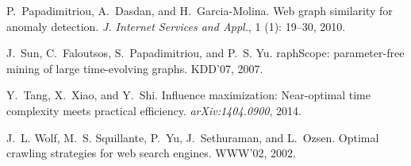 \begin{thebibliography}{41}
P.~Papadimitriou, A.~Dasdan, and H.~Garcia-Molina.
\newblock Web graph similarity for anomaly detection.
\newblock \emph{J. Internet Services and Appl.}, 1
  (1): 19--30, 2010.

J.~Sun, C.~Faloutsos, S.~Papadimitriou, and P.~S. Yu.
raph{S}cope: parameter-free mining of large time-evolving graphs.
\newblock KDD'07, 2007.

Y.~Tang, X.~Xiao, and Y.~Shi.
\newblock Influence maximization: Near-optimal time complexity meets practical
  efficiency.
\newblock \emph{arXiv:1404.0900}, 2014.

J.~L. Wolf, M.~S. Squillante, P.~Yu, J.~Sethuraman, and L.~Ozsen.
\newblock Optimal crawling strategies for web search engines.
\newblock WWW'02, 2002.
\end{thebibliography}
